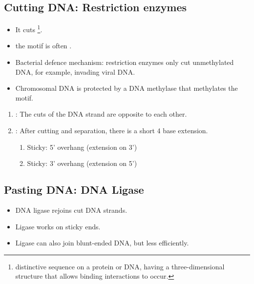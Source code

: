 \subsection{Cutting DNA: Restriction enzymes}
\begin{itemize}
    \item It cuts \footnote{distinctive sequence on a protein or DNA, having a three-dimensional structure that allows binding interactions to occur.}.
    \item the motif is often .
    \item Bacterial defence mechanism: restriction enzymes only cut unmethylated DNA, for example, invading viral DNA.
    \item Chromosomal DNA is protected by a DNA methylase that methylates the motif.
\end{itemize}
\begin{enumerate}
    \item {}: The cuts of the DNA strand are opposite to each other.
    \item {}: After cutting and separation, there is a short 4 base extension.
    \begin{enumerate}
        \item Sticky: 5' overhang (extension on 3')
        \item Sticky: 3' overhang (extension on 5')
    \end{enumerate}
\end{enumerate}
\subsection{Pasting DNA: DNA Ligase}
\begin{itemize} 
    \item DNA ligase rejoins cut DNA strands.
    \item Ligase works on  sticky ends.
    \item Ligase can also join blunt-ended DNA, but less efficiently.
\end{itemize}
